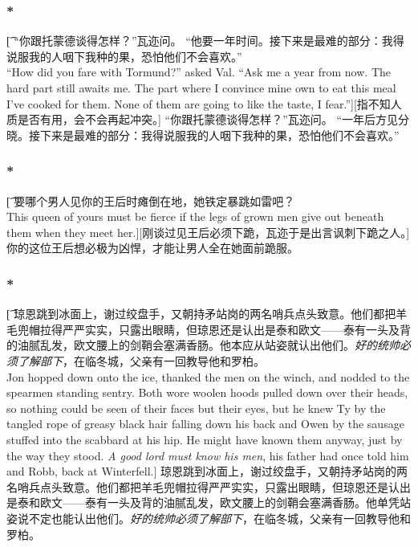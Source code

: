 \documentclass[12pt,a4paper]{article}
\begin{document}
\subsubsection{\color{red}*}\t[
	“你跟托蒙德谈得怎样？”瓦迩问。
	“他要一年时间。接下来是最难的部分：我得说服我的人咽下我种的果，恐怕他们不会喜欢。”\\
	“How did you fare with Tormund?” asked Val.
	“Ask me a year from now. The hard part still awaits me. The part where I convince mine own to eat this meal I've cooked for them. None of them are going to like the taste, I fear.”][指不知人质是否有用，会不会再起冲突。]
	“你跟托蒙德谈得怎样？”瓦迩问。
	“一年后方见分晓。接下来是最难的部分：我得说服我的人咽下我种的果，恐怕他们不会喜欢。”
\subsubsection{\color{red}*}\t[	
	要哪个男人见你的王后时瘫倒在地，她铁定暴跳如雷吧？\\
	This queen of yours must be fierce if the legs of grown men give out beneath them when they meet her.][刚谈过见王后必须下跪，瓦迩于是出言讽刺下跪之人。]
	你的这位王后想必极为凶悍，才能让男人全在她面前跪服。

\subsubsection{\color{red}*}\t[	
	琼恩跳到冰面上，谢过绞盘手，又朝持矛站岗的两名哨兵点头致意。他们都把羊毛兜帽拉得严严实实，只露出眼睛，但琼恩还是认出是泰和欧文——泰有一头及背的油腻乱发，欧文腰上的剑鞘会塞满香肠。他本应从站姿就认出他们。\emph{好的统帅必须了解部下}，在临冬城，父亲有一回教导他和罗柏。\\
	Jon hopped down onto the ice, thanked the men on the winch, and nodded to the spearmen standing sentry. Both wore woolen hoods pulled down over their heads, so nothing could be seen of their faces but their eyes, but he knew Ty by the tangled rope of greasy black hair falling down his back and Owen by the sausage stuffed into the scabbard at his hip. He might have known them anyway, just by the way they stood. \emph{A good lord must know his men}, his father had once told him and Robb, back at Winterfell.]
	琼恩跳到冰面上，谢过绞盘手，又朝持矛站岗的两名哨兵点头致意。他们都把羊毛兜帽拉得严严实实，只露出眼睛，但琼恩还是认出是泰和欧文——泰有一头及背的油腻乱发，欧文腰上的剑鞘会塞满香肠。他单凭站姿说不定也能认出他们。\emph{好的统帅必须了解部下}，在临冬城，父亲有一回教导他和罗柏。
	
\end{document}
